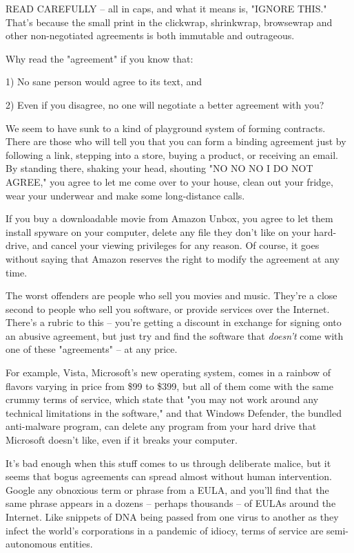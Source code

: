 READ CAREFULLY -- all in caps, and what it means is, "IGNORE THIS."
That's because the small print in the clickwrap, shrinkwrap,
browsewrap and other non-negotiated agreements is both immutable
and outrageous.

Why read the "agreement" if you know that:

1) No sane person would agree to its text, and

2) Even if you disagree, no one will negotiate a better agreement
with you?

We seem to have sunk to a kind of playground system of forming
contracts. There are those who will tell you that you can form a
binding agreement just by following a link, stepping into a store,
buying a product, or receiving an email. By standing there, shaking
your head, shouting "NO NO NO I DO NOT AGREE," you agree to let me
come over to your house, clean out your fridge, wear your underwear
and make some long-distance calls.

If you buy a downloadable movie from Amazon Unbox, you agree to let
them install spyware on your computer, delete any file they don't
like on your hard-drive, and cancel your viewing privileges for any
reason. Of course, it goes without saying that Amazon reserves the
right to modify the agreement at any time.

The worst offenders are people who sell you movies and music.
They're a close second to people who sell you software, or provide
services over the Internet. There's a rubric to this -- you're
getting a discount in exchange for signing onto an abusive
agreement, but just try and find the software that \emph{doesn't}
come with one of these "agreements" -- at any price.

For example, Vista, Microsoft's new operating system, comes in a
rainbow of flavors varying in price from \$99 to \$399, but all of
them come with the same crummy terms of service, which state that
"you may not work around any technical limitations in the
software," and that Windows Defender, the bundled anti-malware
program, can delete any program from your hard drive that Microsoft
doesn't like, even if it breaks your computer.

It's bad enough when this stuff comes to us through deliberate
malice, but it seems that bogus agreements can spread almost
without human intervention. Google any obnoxious term or phrase
from a EULA, and you'll find that the same phrase appears in a
dozens -- perhaps thousands -- of EULAs around the Internet. Like
snippets of DNA being passed from one virus to another as they
infect the world's corporations in a pandemic of idiocy, terms of
service are semi-autonomous entities.

